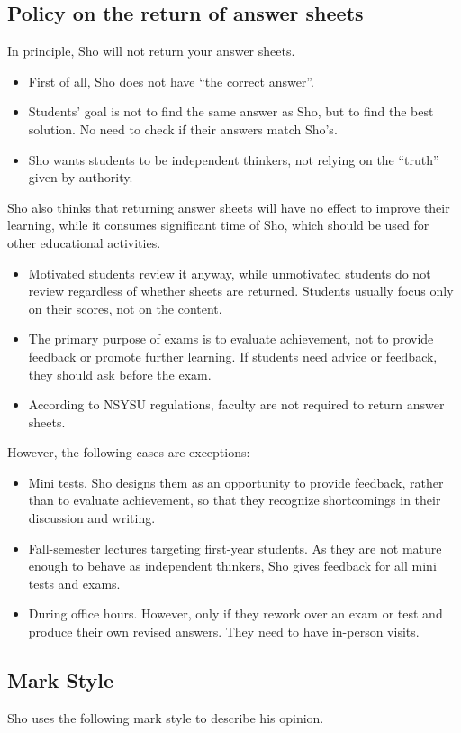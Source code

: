 \documentclass[11pt,pdfa,lastpage,minititle]{MishoNote}
\begin{document}
\subsection*{Policy on the return of answer sheets}
In principle, Sho will not return your answer sheets.
\begin{itemize}
  \item First of all, Sho does not have ``the correct answer''.
  \item Students' goal is not to find the same answer as Sho, but to find the best solution. No need to check if their answers match Sho's.
  \item Sho wants students to be independent thinkers, not relying on the ``truth'' given by authority.
\end{itemize}
Sho also thinks that returning answer sheets will have no effect to improve their learning, while it consumes significant time of Sho, which should be used for other educational activities.
\begin{itemize}
  \item Motivated students review it anyway, while unmotivated students do not review regardless of whether sheets are returned. Students usually focus only on their scores, not on the content.
  \item The primary purpose of exams is to evaluate achievement, not to provide feedback or promote further learning. If students need advice or feedback, they should ask before the exam.
  \item According to NSYSU regulations, faculty are not required to return answer sheets.
\end{itemize}
 However, the following cases are exceptions:
\begin{itemize}
  \item Mini tests. Sho designs them as an opportunity to provide feedback, rather than to evaluate achievement, so that they recognize shortcomings in their discussion and writing.
  \item Fall-semester lectures targeting first-year students. As they are not mature enough to behave as independent thinkers, Sho gives feedback for all mini tests and exams.
  \item During office hours. However, only if they rework over an exam or test and produce their own revised answers. They need to have in-person visits.
\end{itemize}

\subsection*{Mark Style}
Sho uses the following mark style to describe his opinion.
\end{document}
